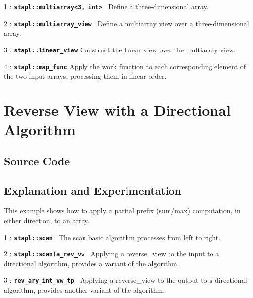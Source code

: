 \documentclass{report}
\begin{document}
\begin{hashitemize}

\item 1 : \texttt{{\bf stapl::multiarray<3, int> }}
\newline
Define a three-dimensional array.

\item 2 : \texttt{{\bf stapl::multiarray\_view }}
\newline
Define a multiarray view over a three-dimensional array.

\item 3 : \texttt{{\bf stapl::linear\_view}}
\newline
Construct the linear view over the multiarray view.

\item 4 : \texttt{{\bf stapl::map\_func}}
\newline
Apply the work function to each corresponding element of the two input
arrays, processing them in linear order.

\end{hashitemize}


\pagebreak
\section{Reverse View with a Directional Algorithm}

\subsection{Source Code}



\subsection{Explanation and Experimentation}

This example shows how to apply a partial prefix (sum/max) computation,
in either direction, to an array.

\begin{hashitemize}
\item 1 : \texttt{{\bf stapl::scan }}
\newline
The scan basic algorithm processes from left to right.

\item 2 : \texttt{{\bf stapl::scan(a\_rev\_vw }}
\newline
 Applying a reverse\_view to the input to a directional algorithm,
  provides a variant of the algorithm.

\item 3 : \texttt{{\bf rev\_ary\_int\_vw\_tp }}
\newline
 Applying a reverse\_view to the output to a directional algorithm,
  provides another variant of the algorithm.

\end{hashitemize}
\end{document}
